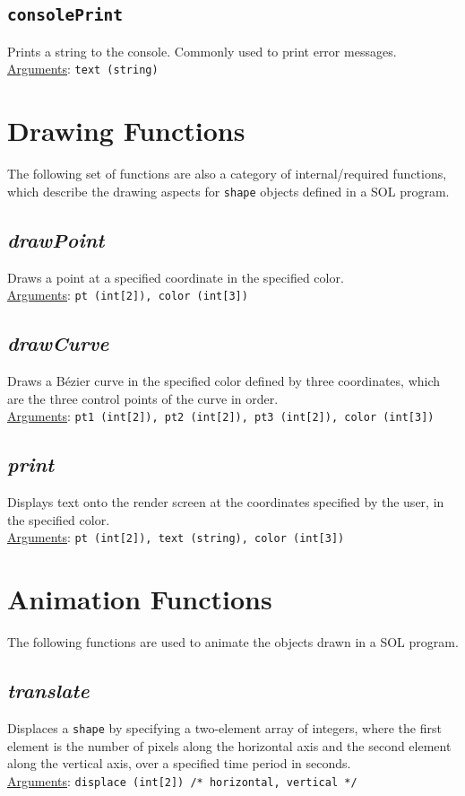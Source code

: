 \documentclass[letterpaper,12pt]{article}
\begin{document}
\subsection{\texttt{consolePrint}}
Prints a string to the console. Commonly used to print error messages.\\
\underline{Arguments}: \texttt{text (string)}


\section{Drawing Functions}
The following set of functions are also a category of internal/required functions, which describe the drawing aspects for \texttt{shape} objects defined in a SOL program.

\subsection{\textit{drawPoint}}
Draws a point at a specified coordinate in the specified color.\\
\underline{Arguments}: \texttt{pt (int[2]), color (int[3])}

\subsection{\textit{drawCurve}}
Draws a B\'ezier curve in the specified color defined by three coordinates, which are the three control points of the curve in order.\\
\underline{Arguments}: \texttt{pt1 (int[2]), pt2 (int[2]), pt3 (int[2]), color (int[3])}

\subsection{\textit{print}}
Displays text onto the render screen at the coordinates specified by the user, in the specified color.\\
\underline{Arguments}: \texttt{pt (int[2]), text (string), color (int[3])}



\section{Animation Functions} \label{animation}
The following functions are used to animate the objects drawn in a SOL program.

\subsection{\textit{translate}}
Displaces a \texttt{shape} by specifying a two-element array of integers, where the first element is the number of pixels along the horizontal axis and the second element along the vertical axis, over a specified time period in seconds.\\
\underline{Arguments}: \texttt{displace (int[2]) /* horizontal, vertical */}
\end{document}
